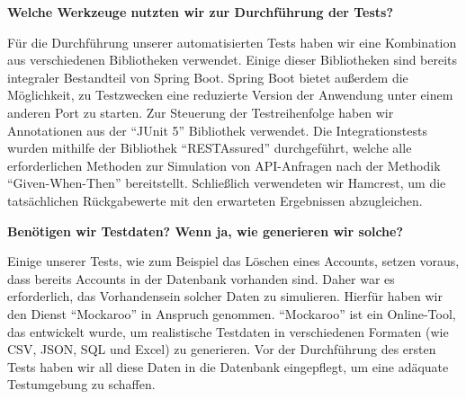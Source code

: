 
\bigskip
\textbf{Welche Werkzeuge nutzten wir zur Durchführung der Tests?}\smallskip

Für die Durchführung unserer automatisierten Tests haben wir eine Kombination aus verschiedenen Bibliotheken verwendet.
Einige dieser Bibliotheken sind bereits integraler Bestandteil von Spring Boot.
Spring Boot bietet außerdem die Möglichkeit, zu Testzwecken eine reduzierte Version der Anwendung unter einem anderen Port zu starten.
Zur Steuerung der Testreihenfolge haben wir Annotationen aus der \enquote{JUnit 5} Bibliothek verwendet.
Die Integrationstests wurden mithilfe der Bibliothek \enquote{RESTAssured} durchgeführt, welche alle erforderlichen Methoden zur Simulation von API-Anfragen nach der Methodik \enquote{Given-When-Then} bereitstellt.
Schließlich verwendeten wir Hamcrest, um die tatsächlichen Rückgabewerte mit den erwarteten Ergebnissen abzugleichen.

\bigskip
\textbf{Benötigen wir Testdaten? Wenn ja, wie generieren wir solche?}\smallskip

Einige unserer Tests, wie zum Beispiel das Löschen eines Accounts, setzen voraus, dass bereits Accounts in der Datenbank vorhanden sind.
Daher war es erforderlich, das Vorhandensein solcher Daten zu simulieren.
Hierfür haben wir den Dienst \enquote{Mockaroo} in Anspruch genommen.
\enquote{Mockaroo} ist ein Online-Tool, das entwickelt wurde, um realistische Testdaten in verschiedenen Formaten (wie CSV, JSON, SQL und Excel) zu generieren.
Vor der Durchführung des ersten Tests haben wir all diese Daten in die Datenbank eingepflegt, um eine adäquate Testumgebung zu schaffen.